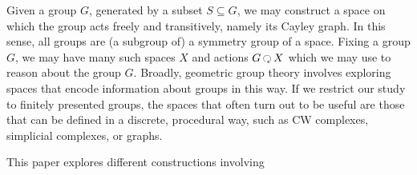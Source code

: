 
Given a group $G$, generated by a subset $S \subseteq G$, we may construct a space on which the group acts freely and transitively, namely its Cayley graph.
In this sense, all groups are (a subgroup of) a symmetry group of a space.
Fixing a group $G$, we may have many such spaces $X$ and actions $G \acts X$  which we may use to reason about the group $G$.
Broadly, geometric group theory involves exploring spaces that encode information about groups in this way.
If we restrict our study to finitely presented groups, the spaces that often turn out to be useful are those that can be defined in a discrete, procedural way, such as CW complexes, simplicial complexes, or graphs.

This paper explores different constructions involving

